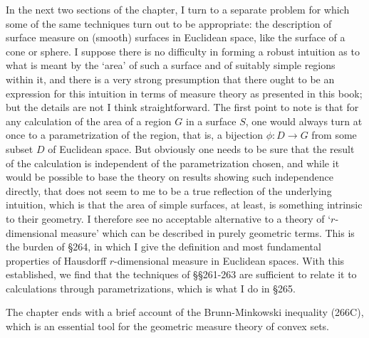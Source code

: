 In the next two sections of the chapter, I turn to a separate problem
for which some of the same techniques turn out to be appropriate:  the
description of surface measure on (smooth) surfaces in Euclidean space,
like the surface of a cone or sphere.   I suppose there is no difficulty
in forming a robust intuition as to what is meant by the `area' of
such a surface and of suitably simple regions within it, and there is a
very strong presumption that there ought to be an expression for this
intuition in terms of measure theory as presented in this book;  but the
details are not I think straightforward.   The first point to note is
that for any calculation of the area of a region $G$ in a surface $S$,
one would always turn at once to a parametrization of the region, that
is, a bijection $\phi:D\to G$ from some subset $D$ of Euclidean space.
But obviously one needs to be sure that the result of the calculation is
independent of the parametrization chosen, and while it would be
possible to base the theory on results showing such independence
directly, that does not seem to me to be a true reflection of the
underlying intuition, which is that the area of simple surfaces, at
least, is something intrinsic to their geometry.   I therefore see no
acceptable alternative to a theory of `$r$-dimensional measure' which
can be described in purely geometric terms.   This is the burden of
\S264, in which I give the definition and most fundamental properties
of Hausdorff $r$-dimensional measure in Euclidean spaces.   With this
established, we find that the techniques of \S\S261-263 are sufficient
to relate it to calculations through parametrizations, which is what I
do in \S265.

The chapter ends with a brief account of the Brunn-Minkowski inequality 
(266C), which is an essential tool for the geometric measure theory of 
convex sets.

\discrpage

